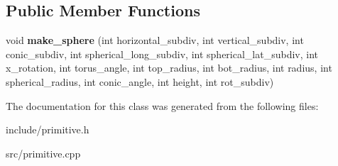 \subsection*{Public Member Functions}
\begin{DoxyCompactItemize}
\item 
\mbox{\label{classsphere_aebf6f0ef766b2e92b8d60ccd704613b7}} 
void {\bfseries make\+\_\+sphere} (int horizontal\+\_\+subdiv, int vertical\+\_\+subdiv, int conic\+\_\+subdiv, int spherical\+\_\+long\+\_\+subdiv, int spherical\+\_\+lat\+\_\+subdiv, int x\+\_\+rotation, int torus\+\_\+angle, int top\+\_\+radius, int bot\+\_\+radius, int radius, int spherical\+\_\+radius, int conic\+\_\+angle, int height, int rot\+\_\+subdiv)
\end{DoxyCompactItemize}


The documentation for this class was generated from the following files\+:\begin{DoxyCompactItemize}
\item 
include/primitive.\+h\item 
src/primitive.\+cpp\end{DoxyCompactItemize}
